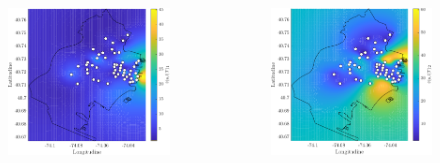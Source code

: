 \begin{frame}
	\centering
	\begin{columns}
		\begin{column}{0.33\linewidth}
			\centering
			\begin{figure}
				\includegraphics[width=\textwidth]{../Tesi/Immagini/4. Caso di studio/Kriging/Mappa volume, 1}
			\end{figure}
		\end{column}
		\begin{column}{0.33\linewidth}
			\centering
			\begin{figure}
				\includegraphics[width=\textwidth]{../Tesi/Immagini/4. Caso di studio/Kriging/Mappa volume, 2}

\end{figure}
\end{column}
\end{columns}
\end{frame}
